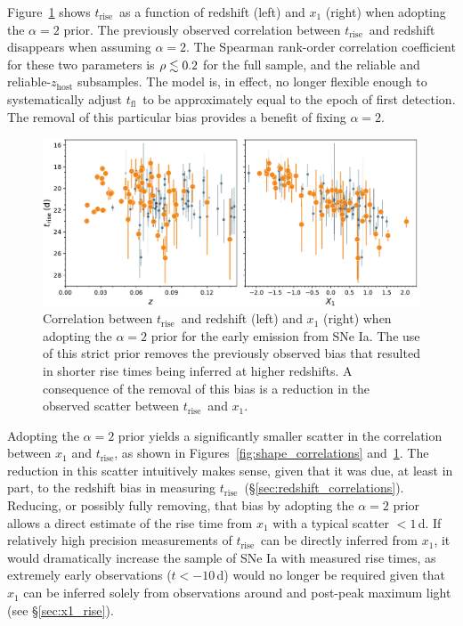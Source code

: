 \documentclass[twocolumn]{aastex63}
\newcommand{\tfl}{$t_\mathrm{fl}$}
\newcommand{\trise}{$t_\mathrm{rise}$}
\begin{document}
Figure~\ref{fig:tsquared_z_evolution} shows \trise\ as a function of redshift
(left) and $x_1$ (right) when adopting the $\alpha = 2$ prior. The previously
observed correlation between \trise\ and redshift disappears when assuming
$\alpha = 2$. The Spearman rank-order correlation coefficient for these two
parameters is $\rho \lesssim 0.2$ for the full sample, and the reliable and
reliable-$z_\mathrm{host}$ subsamples. The model is, in effect, no longer
flexible enough to systematically adjust \tfl\ to be approximately equal to
the epoch of first detection. The removal of this particular bias provides a
benefit of fixing $\alpha = 2$.

\begin{figure}
    \centering
    \includegraphics[width=6in]{./figures/trise_z_tsquared.pdf}
    \caption{Correlation between \trise\ and redshift (left) and $x_1$ (right)
    when adopting the $\alpha = 2$ prior for the early emission from SNe Ia.
    The use of this strict prior removes the previously observed bias that
    resulted in shorter rise times being inferred at higher redshifts. A
    consequence of the removal of this bias is a reduction in the observed
    scatter between \trise\ and $x_1$.}
    \label{fig:tsquared_z_evolution}
\end{figure}


Adopting the $\alpha = 2$ prior yields a significantly smaller scatter in the
correlation between $x_1$ and \trise, as shown in
Figures~\ref{fig:shape_correlations} and~\ref{fig:tsquared_z_evolution}. The
reduction in this scatter intuitively makes sense, given that it was due, at
least in part, to the redshift bias in measuring \trise\
(\S\ref{sec:redshift_correlations}). Reducing, or possibly fully removing,
that bias by adopting the $\alpha = 2$ prior allows a direct estimate of the
rise time from $x_1$ with a typical scatter $< 1$\,d. If relatively high
precision measurements of \trise\ can be directly inferred from $x_1$, it
would dramatically increase the sample of SNe Ia with measured rise times, as
extremely early observations ($t < -10$\,d) would no longer be required given
that $x_1$ can be inferred solely from observations around and post-peak
maximum light (see \S\ref{sec:x1_rise}).
\end{document}
